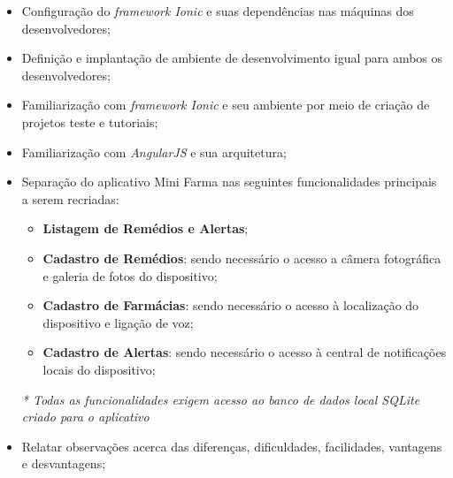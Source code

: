 \begin{itemize}
    \item Configuração do \textit{framework Ionic} e suas dependências nas máquinas dos desenvolvedores;
    \item Definição e implantação de ambiente de desenvolvimento igual para ambos os desenvolvedores;
    \item Familiarização com \textit{framework Ionic} e seu ambiente por meio de criação de projetos teste e tutoriais;
    \item Familiarização com \textit{AngularJS} e sua arquitetura; 
    \item Separação do aplicativo Mini Farma nas seguintes funcionalidades principais a serem recriadas:
        \begin{itemize}
            \item \textbf{Listagem de Remédios e Alertas};
            \item \textbf{Cadastro de Remédios}: sendo necessário o acesso a câmera fotográfica e galeria de fotos do dispositivo;
            \item \textbf{Cadastro de Farmácias}: sendo necessário o acesso à localização do dispositivo e ligação de voz;
            \item \textbf{Cadastro de Alertas}: sendo necessário o acesso à central de notificações locais do dispositivo;
        \end{itemize}
        \textit{* Todas as funcionalidades exigem acesso ao banco de dados local SQLite criado para o aplicativo}
    \item Relatar observações acerca das diferenças, dificuldades, facilidades, vantagens e desvantagens;
\end{itemize}